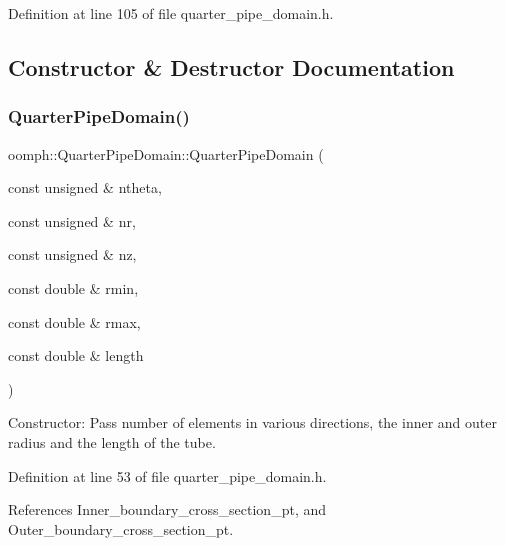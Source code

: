 Definition at line 105 of file quarter\+\_\+pipe\+\_\+domain.\+h.



\subsection{Constructor \& Destructor Documentation}
\mbox{\label{classoomph_1_1QuarterPipeDomain_afb9763dac929fd4371a6ef860d9a5caf}} 
\subsubsection{\texorpdfstring{Quarter\+Pipe\+Domain()}{QuarterPipeDomain()}\hspace{0.1cm}{\footnotesize\ttfamily [1/2]}}
{\footnotesize\ttfamily oomph\+::\+Quarter\+Pipe\+Domain\+::\+Quarter\+Pipe\+Domain (\begin{DoxyParamCaption}\item[{const unsigned \&}]{ntheta,  }\item[{const unsigned \&}]{nr,  }\item[{const unsigned \&}]{nz,  }\item[{const double \&}]{rmin,  }\item[{const double \&}]{rmax,  }\item[{const double \&}]{length }\end{DoxyParamCaption})\hspace{0.3cm}{\ttfamily [inline]}}



Constructor\+: Pass number of elements in various directions, the inner and outer radius and the length of the tube. 



Definition at line 53 of file quarter\+\_\+pipe\+\_\+domain.\+h.



References Inner\+\_\+boundary\+\_\+cross\+\_\+section\+\_\+pt, and Outer\+\_\+boundary\+\_\+cross\+\_\+section\+\_\+pt.

\mbox{\label{classoomph_1_1QuarterPipeDomain_a09e3620b090b3bae5d2bf8c2e6ac9812}} 
